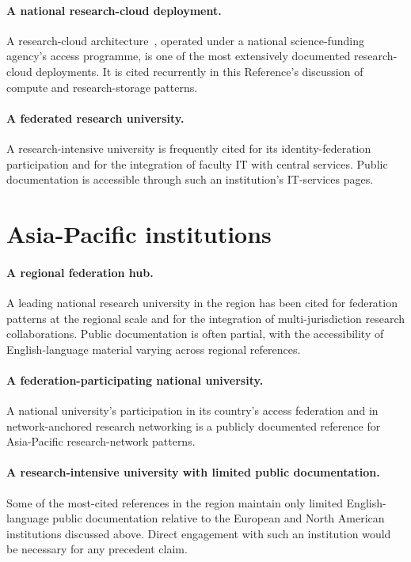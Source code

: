 \paragraph{A national research-cloud deployment.} A
research-cloud architecture~\cite{jetstream2-2021}, operated under
a national science-funding agency's access programme, is one of
the most extensively documented research-cloud deployments. It is
cited recurrently in this Reference's discussion of compute and
research-storage patterns.

\paragraph{A federated research university.} A research-intensive
university is frequently cited for its identity-federation
participation and for the integration of faculty IT with central
services. Public documentation is accessible through such an
institution's IT-services pages.

\section{Asia-Pacific institutions}
\label{sec:ip-asia-pacific}

\paragraph{A regional federation hub.} A leading
national research university in the region has been cited for
federation patterns at the regional scale and for the integration
of multi-jurisdiction research collaborations. Public
documentation is often partial, with the accessibility of
English-language material varying across regional references.

\paragraph{A federation-participating national university.} A
national university's participation in its country's access
federation and in network-anchored research networking is a
publicly documented reference for Asia-Pacific research-network
patterns.

\paragraph{A research-intensive university with limited public
documentation.} Some of the most-cited references in the region
maintain only limited English-language public documentation
relative to the European and North American institutions
discussed above. Direct engagement with such an institution would
be necessary for any precedent claim.

